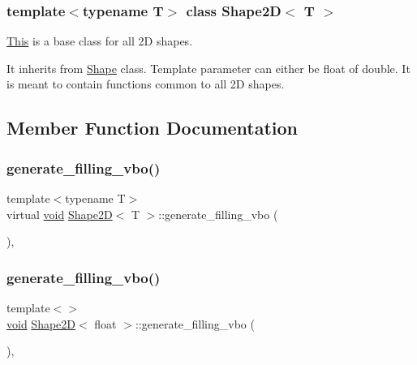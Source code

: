 \subsubsection*{template$<$typename T$>$\newline
class Shape2\+D$<$ T $>$}

\mbox{\hyperlink{classThis}{This}} is a base class for all 2D shapes. 

It inherits from \mbox{\hyperlink{classShape}{Shape}} class. Template parameter can either be float of double. It is meant to contain functions common to all 2D shapes. 

\subsection{Member Function Documentation}
\mbox{\label{classShape2D_a917c3277ca262ec557930c8cc837c204}} 
\subsubsection{\texorpdfstring{generate\+\_\+filling\+\_\+vbo()}{generate\_filling\_vbo()}\hspace{0.1cm}{\footnotesize\ttfamily [1/2]}}
{\footnotesize\ttfamily template$<$typename T$>$ \\
virtual \mbox{\hyperlink{glad_8h_a950fc91edb4504f62f1c577bf4727c29}{void}} \mbox{\hyperlink{classShape2D}{Shape2D}}$<$ T $>$\+::generate\+\_\+filling\+\_\+vbo (\begin{DoxyParamCaption}{ }\end{DoxyParamCaption})\hspace{0.3cm}{\ttfamily [protected]}, {\ttfamily [virtual]}}

\mbox{\label{classShape2D_a328d401b8f1962078e904d4b1003d7a5}} 
\subsubsection{\texorpdfstring{generate\+\_\+filling\+\_\+vbo()}{generate\_filling\_vbo()}\hspace{0.1cm}{\footnotesize\ttfamily [2/2]}}
{\footnotesize\ttfamily template$<$$>$ \\
\mbox{\hyperlink{glad_8h_a950fc91edb4504f62f1c577bf4727c29}{void}} \mbox{\hyperlink{classShape2D}{Shape2D}}$<$ float $>$\+::generate\+\_\+filling\+\_\+vbo (\begin{DoxyParamCaption}{ }\end{DoxyParamCaption})\hspace{0.3cm}{\ttfamily [inline]}, {\ttfamily [protected]}}



